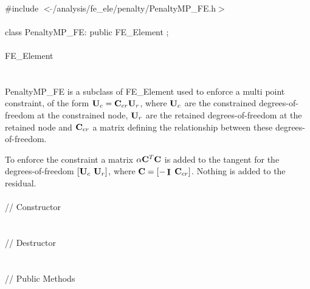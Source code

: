 
   \\
\indent \#include $<\tilde{ }$/analysis/fe\_ele/penalty/PenaltyMP\_FE.h$>$  \\

  \\
\indent class PenaltyMP\_FE: public FE\_Element ;  \\

  \\
\indent FE\_Element \\
\indent{} \\ 

  \\
\indent PenaltyMP\_FE is a subclass of FE\_Element used to enforce a
multi point constraint, of the form ${\bf U}_c = {\bf C}_{cr} {\bf U}_r$, where ${\bf U}_c$ are
the constrained degrees-of-freedom at the constrained node, ${\bf U}_r$ are
the retained degrees-of-freedom at the retained node and ${\bf C}_{cr}$ a
matrix defining the relationship between these degrees-of-freedom. 

To enforce the constraint a matrix $\alpha {\bf C}^T {\bf C}$ is added to the
tangent for the degrees-of-freedom $[{\bf U}_c$ ${\bf U}_r]$, where ${\bf C} = [-\mathop{\cal {\bf I}}$ 
${\bf C}_{cr}]$. Nothing is added to the residual. \\  

  \\
\indent\indent // Constructor  \\
\indent{} \\ \\
\indent\indent // Destructor  \\
\indent{}  \\ \\
\indent\indent // Public Methods \\
\indent{} \\ 
\indent{} \\  
\indent{} \\ 
\indent{}\\


